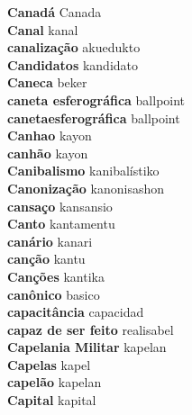 \textbf{ Canadá  } Canada \\
\textbf{ Canal  } kanal \\
\textbf{ canalização  } akuedukto \\
\textbf{ Candidatos  } kandidato \\
\textbf{ Caneca  } beker \\
\textbf{ caneta esferográfica  } ballpoint \\
\textbf{ canetaesferográfica  } ballpoint \\
\textbf{ Canhao  } kayon \\
\textbf{ canhão  } kayon \\
\textbf{ Canibalismo  } kanibalístiko \\
\textbf{ Canonização  } kanonisashon \\
\textbf{ cansaço  } kansansio \\
\textbf{ Canto  } kantamentu \\
\textbf{ canário  } kanari \\
\textbf{ canção  } kantu \\
\textbf{ Canções  } kantika \\
\textbf{ canônico  } basico \\
\textbf{ capacitância  } capacidad \\
\textbf{ capaz de ser feito  } realisabel \\
\textbf{ Capelania Militar  } kapelan \\
\textbf{ Capelas  } kapel \\
\textbf{ capelão  } kapelan \\
\textbf{ Capital  } kapital \\
